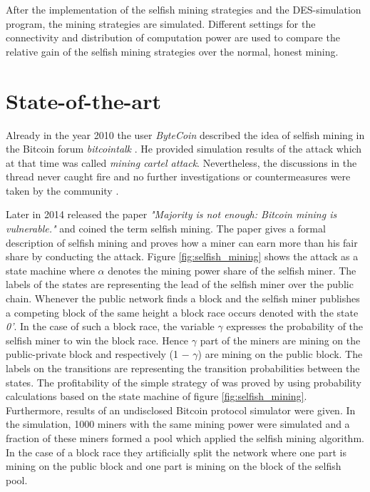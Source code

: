 \documentclass{scrartcl}
\begin{document}
After the implementation of the selfish mining strategies and the DES-simulation program, the mining strategies are simulated. Different settings for the connectivity and distribution of computation power are used to compare the relative gain of the selfish mining strategies over the normal, honest mining.

\section{State-of-the-art}
Already in the year 2010 the user \textit{ByteCoin} described the idea of selfish mining in the Bitcoin forum \textit{bitcointalk} \cite{ByteCoin2010}. He provided simulation results of the attack which at that time was called \textit{mining cartel attack}. Nevertheless, the discussions in the thread never caught fire and no further investigations or countermeasures were taken by the community \citep{BitcoinTalk2010, bahack2013theoretical}.

Later in 2014 \citeauthor{eyal2014majority} released the paper \textit{"Majority is not enough: Bitcoin mining is vulnerable."} and coined the term selfish mining. The paper gives a formal description of selfish mining and proves how a miner can earn more than his fair share by conducting the attack. Figure \ref{fig:selfish_mining} shows the attack as a state machine where $\alpha$ denotes the mining power share of the selfish miner. The labels of the states are representing the lead of the selfish miner over the public chain. Whenever the public network finds a block and the selfish miner publishes a competing block of the same height a block race occurs denoted with the state \textit{0'}. In the case of such a block race, the variable $\gamma$ expresses the probability of the selfish miner to win the block race. Hence $\gamma$ part of the miners are mining on the public-private block and respectively (1 − $\gamma$) are mining on the public block. The labels on the transitions are representing the transition probabilities between the states. The profitability of the simple strategy of \cite{eyal2014majority} was proved by using probability calculations based on the state machine of figure \ref{fig:selfish_mining}. Furthermore, results of an undisclosed Bitcoin protocol simulator were given. In the simulation, 1000 miners with the same mining power were simulated and a fraction of these miners formed a pool which applied the selfish mining algorithm. In the case of a block race they artificially split the network where one part is mining on the public block and one part is mining on the block of the selfish pool.
\end{document}
